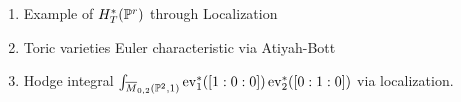 \documentclass[12pt]{memoir}
\begin{document}
\begin{enumerate}
    \item Example of $H^\ast_T(\mathbb{P}^r)$ through Localization
    \item Toric varieties Euler characteristic via Atiyah-Bott
    \item Hodge integral $\int_{\overline M_{0,2}(\mathbb{P}^2,1)}\operatorname{ev}_1^\ast([1:0:0])\operatorname{ev}_2^\ast([0:1:0])$ via localization.
\end{enumerate}

\ifx\nextra\undefined
\printindex
\else\fi
\nocite{*}


\end{document}
